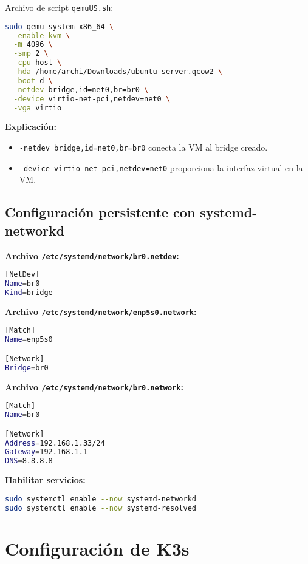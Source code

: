 \documentclass[12pt, a4paper]{article}
\begin{document}
Archivo de script \texttt{qemuUS.sh}:

\begin{lstlisting}[language=bash, caption=Script para lanzar VM con QEMU usando br0]
sudo qemu-system-x86_64 \
  -enable-kvm \
  -m 4096 \
  -smp 2 \
  -cpu host \
  -hda /home/archi/Downloads/ubuntu-server.qcow2 \
  -boot d \
  -netdev bridge,id=net0,br=br0 \
  -device virtio-net-pci,netdev=net0 \
  -vga virtio
\end{lstlisting}

\textbf{Explicación:}
\begin{itemize}
    \item \texttt{-netdev bridge,id=net0,br=br0} conecta la VM al bridge creado.
    \item \texttt{-device virtio-net-pci,netdev=net0} proporciona la interfaz virtual en la VM.
\end{itemize}

\subsection{Configuración persistente con systemd-networkd}

\textbf{Archivo \texttt{/etc/systemd/network/br0.netdev}:}
\begin{lstlisting}[language=bash]
[NetDev]
Name=br0
Kind=bridge
\end{lstlisting}

\textbf{Archivo \texttt{/etc/systemd/network/enp5s0.network}:}
\begin{lstlisting}[language=bash]
[Match]
Name=enp5s0

[Network]
Bridge=br0
\end{lstlisting}

\textbf{Archivo \texttt{/etc/systemd/network/br0.network}:}
\begin{lstlisting}[language=bash]
[Match]
Name=br0

[Network]
Address=192.168.1.33/24
Gateway=192.168.1.1
DNS=8.8.8.8
\end{lstlisting}

\textbf{Habilitar servicios:}
\begin{lstlisting}[language=bash]
sudo systemctl enable --now systemd-networkd
sudo systemctl enable --now systemd-resolved
\end{lstlisting}

\section{Configuración de K3s}
\end{document}
